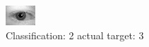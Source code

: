 \begin{figure}[h!]
\begin{center}
\includegraphics[width=0.60\columnwidth]{figures/ID578_class_2_target_3.png}
\end{center}
\caption{ Classification: 2 actual target: 3}
\label{fig:ID578_class_2_target_3}
\end{figure}
